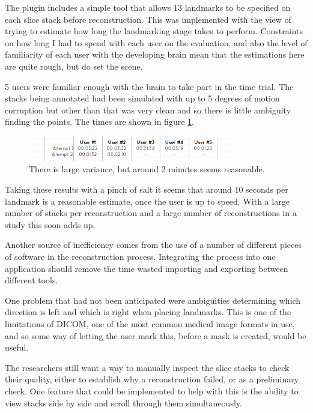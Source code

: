The plugin includes a simple tool that allows 13 landmarks to be specified on each slice stack before reconstruction. This was implemented with the view of trying to estimate how long the landmarking stage takes to perform. Constraints on how long I had to spend with each user on the evaluation, and also the level of familiarity of each user with the developing brain mean that the estimations here are quite rough, but do set the scene.

5 users were familiar enough with the brain to take part in the time trial. The stacks being annotated had been simulated with up to 5 degrees of motion corruption but other than that was very clean and so there is little ambiguity finding the points. The times are shown in figure \ref{fig:landmarktimes}.

\begin{figure}[h]
    \centering
  \includegraphics[width=0.8\textwidth]{images/evaluation/graph_reconstruction_landmark_times.png}
    \caption{There is large variance, but around 2 minutes seems reasonable.}\label{fig:landmarktimes}
\end{figure}

Taking these results with a pinch of salt it seems that around 10 seconds per landmark is a reasonable estimate, once the user is up to speed. With a large number of stacks per reconstruction and a large number of reconstructions in a study this soon adds up.

Another source of inefficiency comes from the use of a number of different pieces of software in the reconstruction process. Integrating the process into one application should remove the time wasted importing and exporting between different tools.

One problem that had not been anticipated were ambiguities determining which direction is left and which is right when placing landmarks. This is one of the limitations of DICOM, one of the most common medical image formats in use, and so some way of letting the user mark this, before a mask is created, would be useful.

The researchers still want a way to manually inspect the slice stacks to check their quality, either to establish why a reconstruction failed, or as a preliminary check. One feature that could be implemented to help with this is the ability to view stacks side by side and scroll through them simultaneously.

